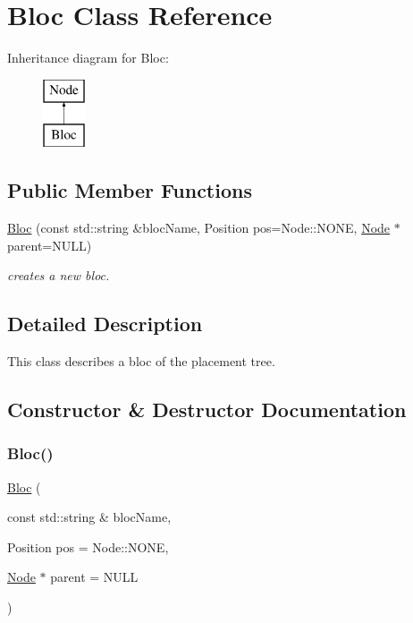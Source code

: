 \hypertarget{class_open_chams_1_1_bloc}{}\section{Bloc Class Reference}
\label{class_open_chams_1_1_bloc}
Inheritance diagram for Bloc\+:\begin{figure}[H]
\begin{center}
\leavevmode
\includegraphics[height=2.000000cm]{class_open_chams_1_1_bloc}
\end{center}
\end{figure}
\subsection*{Public Member Functions}
\begin{DoxyCompactItemize}
\item 
\mbox{\hyperlink{class_open_chams_1_1_bloc_a06a4a848ddb493d0026abe2b307aa94a}{Bloc}} (const std\+::string \&bloc\+Name, Position pos=Node\+::\+N\+O\+NE, \mbox{\hyperlink{class_open_chams_1_1_node}{Node}} $\ast$parent=N\+U\+LL)
\begin{DoxyCompactList}\small\item\em creates a new bloc. \end{DoxyCompactList}\end{DoxyCompactItemize}


\subsection{Detailed Description}
This class describes a bloc of the placement tree. 

\subsection{Constructor \& Destructor Documentation}
\mbox{\label{class_open_chams_1_1_bloc_a06a4a848ddb493d0026abe2b307aa94a}} 
\subsubsection{\texorpdfstring{Bloc()}{Bloc()}}
{\footnotesize\ttfamily \mbox{\hyperlink{class_open_chams_1_1_bloc}{Bloc}} (\begin{DoxyParamCaption}\item[{const std\+::string \&}]{bloc\+Name,  }\item[{Position}]{pos = {\ttfamily Node\+:\+:NONE},  }\item[{\mbox{\hyperlink{class_open_chams_1_1_node}{Node}} $\ast$}]{parent = {\ttfamily NULL} }\end{DoxyParamCaption})}



